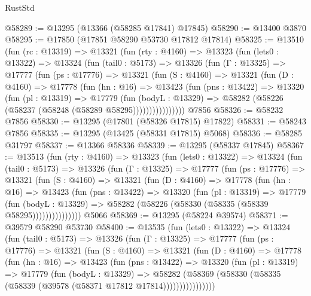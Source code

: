 \begin{lexlean}{RustStd}
\begin{coremodule}
@58289 := @13295 (@13366 (@58285 @17841) @17845)
@58290 := @13400 @3870
@58295 := @17850 (@17851 @58290 @53730 @17812 @17814)
@58325 := @13510
    (fun (rc : @13319) =>
    @13321
      (fun (rty : @4160) =>
      @13323
        (fun (lets0 : @13322) =>
        @13324
          (fun (tail0 : @5173) =>
          @13326
            (fun (Γ : @13325) =>
            @17777
              (fun (ps : @17776) =>
              @13321
                (fun (S : @4160) =>
                @13321
                  (fun (D : @4160) =>
                  @17778
                    (fun (hn : @16) =>
                    @13423
                      (fun (pns : @13422) =>
                      @13320
                        (fun (pl : @13319) =>
                        @17779
                          (fun (bodyL : @13329) =>
                          @58282 (@58226 (@58237 (@58248 (@58289 @58295))))))))))))))))
    @7856
@58326 := @58232 @7856
@58330 := @13295 (@17801 (@58326 @17815) @17822)
@58331 := @58243 @7856
@58335 := @13295 (@13425 (@58331 @17815) @5068)
@58336 := @58285 @31797
@58337 := @13366 @58336
@58339 := @13295 (@58337 @17845)
@58367 := @13513
    (fun (rty : @4160) =>
    @13323
      (fun (lets0 : @13322) =>
      @13324
        (fun (tail0 : @5173) =>
        @13326
          (fun (Γ : @13325) =>
          @17777
            (fun (ps : @17776) =>
            @13321
              (fun (S : @4160) =>
              @13321
                (fun (D : @4160) =>
                @17778
                  (fun (hn : @16) =>
                  @13423
                    (fun (pns : @13422) =>
                    @13320
                      (fun (pl : @13319) =>
                      @17779
                        (fun (bodyL : @13329) =>
                        @58282 (@58226 (@58330 (@58335 (@58339 @58295)))))))))))))))
    @5066
@58369 := @13295 (@58224 @39574)
@58371 := @39579 @58290 @53730
@58400 := @13535
    (fun (lets0 : @13322) =>
    @13324
      (fun (tail0 : @5173) =>
      @13326
        (fun (Γ : @13325) =>
        @17777
          (fun (ps : @17776) =>
          @13321
            (fun (S : @4160) =>
            @13321
              (fun (D : @4160) =>
              @17778
                (fun (hn : @16) =>
                @13423
                  (fun (pns : @13422) =>
                  @13320
                    (fun (pl : @13319) =>
                    @17779
                      (fun (bodyL : @13329) =>
                      @58282
                        (@58369
                          (@58330 (@58335 (@58339 (@39578 (@58371 @17812 @17814))))))))))))))))

\end{coremodule}
\end{lexlean}
